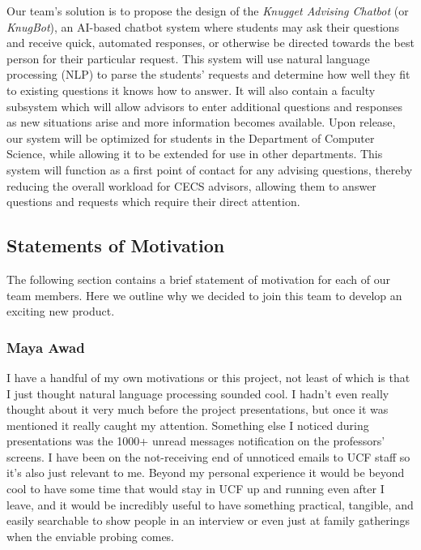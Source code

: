\documentclass[titlepage, 12pt]{article}
\begin{document}
Our team’s solution is to propose the design of the \emph{Knugget Advising Chatbot} (or \emph{KnugBot}), an AI-based chatbot system where students may ask their questions and receive quick, automated responses, or otherwise be directed towards the best person for their particular request. This system will use natural language processing (NLP) to parse the students’ requests and determine how well they fit to existing questions it knows how to answer. It will also contain a faculty subsystem which will allow advisors to enter additional questions and responses as new situations arise and more information becomes available. Upon release, our system will be optimized for students in the Department of Computer Science, while allowing it to be extended for use in other departments. This system will function as a first point of contact for any advising questions, thereby reducing the overall workload for CECS advisors, allowing them to answer questions and requests which require their direct attention.

\subsection{Statements of Motivation}

The following section contains a brief statement of motivation for each of our team members. Here we outline why we decided to join this team to develop an exciting new product.

\subsubsection{Maya Awad}

I have a handful of my own motivations or this project, not least of which is that I just thought natural language processing sounded cool. I hadn’t even really thought about it very much before the project presentations, but once it was mentioned it really caught my attention. Something else I noticed during presentations was the 1000+ unread messages notification on the professors’ screens. I have been on the not-receiving end of unnoticed emails to UCF staff so it’s also just relevant to me. Beyond my personal experience it would be beyond cool to have some time that would stay in UCF up and running even after I leave, and it would be incredibly useful to have something practical, tangible, and easily searchable to show people in an interview or even just at family gatherings when the enviable probing comes.
\end{document}
